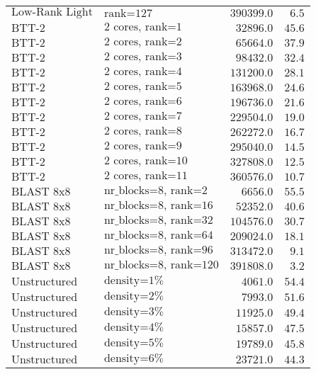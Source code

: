 \begin{longtable}{llrr}
$\text{Low-Rank Light}$ & $\text{rank=127}$ & $390399.0$ & $6.5$\\
$\text{BTT-2}$ & $\text{2 cores, rank=1}$ & $32896.0$ & $45.6$\\
$\text{BTT-2}$ & $\text{2 cores, rank=2}$ & $65664.0$ & $37.9$\\
$\text{BTT-2}$ & $\text{2 cores, rank=3}$ & $98432.0$ & $32.4$\\
$\text{BTT-2}$ & $\text{2 cores, rank=4}$ & $131200.0$ & $28.1$\\
$\text{BTT-2}$ & $\text{2 cores, rank=5}$ & $163968.0$ & $24.6$\\
$\text{BTT-2}$ & $\text{2 cores, rank=6}$ & $196736.0$ & $21.6$\\
$\text{BTT-2}$ & $\text{2 cores, rank=7}$ & $229504.0$ & $19.0$\\
$\text{BTT-2}$ & $\text{2 cores, rank=8}$ & $262272.0$ & $16.7$\\
$\text{BTT-2}$ & $\text{2 cores, rank=9}$ & $295040.0$ & $14.5$\\
$\text{BTT-2}$ & $\text{2 cores, rank=10}$ & $327808.0$ & $12.5$\\
$\text{BTT-2}$ & $\text{2 cores, rank=11}$ & $360576.0$ & $10.7$\\
$\text{BLAST 8x8}$ & $\text{nr\_blocks=8, rank=2}$ & $6656.0$ & $55.5$\\
$\text{BLAST 8x8}$ & $\text{nr\_blocks=8, rank=16}$ & $52352.0$ & $40.6$\\
$\text{BLAST 8x8}$ & $\text{nr\_blocks=8, rank=32}$ & $104576.0$ & $30.7$\\
$\text{BLAST 8x8}$ & $\text{nr\_blocks=8, rank=64}$ & $209024.0$ & $18.1$\\
$\text{BLAST 8x8}$ & $\text{nr\_blocks=8, rank=96}$ & $313472.0$ & $9.1$\\
$\text{BLAST 8x8}$ & $\text{nr\_blocks=8, rank=120}$ & $391808.0$ & $3.2$\\
$\text{Unstructured}$ & $\text{density=1\%}$ & $4061.0$ & $54.4$\\
$\text{Unstructured}$ & $\text{density=2\%}$ & $7993.0$ & $51.6$\\
$\text{Unstructured}$ & $\text{density=3\%}$ & $11925.0$ & $49.4$\\
$\text{Unstructured}$ & $\text{density=4\%}$ & $15857.0$ & $47.5$\\
$\text{Unstructured}$ & $\text{density=5\%}$ & $19789.0$ & $45.8$\\
$\text{Unstructured}$ & $\text{density=6\%}$ & $23721.0$ & $44.3$\\

\end{longtable}
